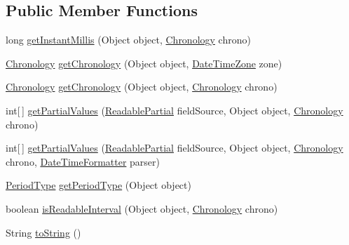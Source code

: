 \subsection*{Public Member Functions}
\begin{DoxyCompactItemize}
\item 
long \hyperlink{classorg_1_1joda_1_1time_1_1convert_1_1_abstract_converter_a3b4d9110045f9d18d2ef6b42406c32d6}{get\-Instant\-Millis} (Object object, \hyperlink{classorg_1_1joda_1_1time_1_1_chronology}{Chronology} chrono)
\item 
\hyperlink{classorg_1_1joda_1_1time_1_1_chronology}{Chronology} \hyperlink{classorg_1_1joda_1_1time_1_1convert_1_1_abstract_converter_a99af9b9b29516c511d9d96b77d075835}{get\-Chronology} (Object object, \hyperlink{classorg_1_1joda_1_1time_1_1_date_time_zone}{Date\-Time\-Zone} zone)
\item 
\hyperlink{classorg_1_1joda_1_1time_1_1_chronology}{Chronology} \hyperlink{classorg_1_1joda_1_1time_1_1convert_1_1_abstract_converter_af7c155e2b36a2d55b64ee16b5d36251a}{get\-Chronology} (Object object, \hyperlink{classorg_1_1joda_1_1time_1_1_chronology}{Chronology} chrono)
\item 
int\mbox{[}$\,$\mbox{]} \hyperlink{classorg_1_1joda_1_1time_1_1convert_1_1_abstract_converter_aa2e7d0aaf23089e30fbe7bd3fdb70365}{get\-Partial\-Values} (\hyperlink{interfaceorg_1_1joda_1_1time_1_1_readable_partial}{Readable\-Partial} field\-Source, Object object, \hyperlink{classorg_1_1joda_1_1time_1_1_chronology}{Chronology} chrono)
\item 
int\mbox{[}$\,$\mbox{]} \hyperlink{classorg_1_1joda_1_1time_1_1convert_1_1_abstract_converter_ab87690fc9f7cab737d4a19cc1a75191a}{get\-Partial\-Values} (\hyperlink{interfaceorg_1_1joda_1_1time_1_1_readable_partial}{Readable\-Partial} field\-Source, Object object, \hyperlink{classorg_1_1joda_1_1time_1_1_chronology}{Chronology} chrono, \hyperlink{classorg_1_1joda_1_1time_1_1format_1_1_date_time_formatter}{Date\-Time\-Formatter} parser)
\item 
\hyperlink{classorg_1_1joda_1_1time_1_1_period_type}{Period\-Type} \hyperlink{classorg_1_1joda_1_1time_1_1convert_1_1_abstract_converter_a4c38ee64cfe5ee54062227bee13dd5cc}{get\-Period\-Type} (Object object)
\item 
boolean \hyperlink{classorg_1_1joda_1_1time_1_1convert_1_1_abstract_converter_a261e94112cc59857b7bd28b1206eea4d}{is\-Readable\-Interval} (Object object, \hyperlink{classorg_1_1joda_1_1time_1_1_chronology}{Chronology} chrono)
\item 
String \hyperlink{classorg_1_1joda_1_1time_1_1convert_1_1_abstract_converter_a39bda1571ce4702542b47a7e7a0b3829}{to\-String} ()
\end{DoxyCompactItemize}
